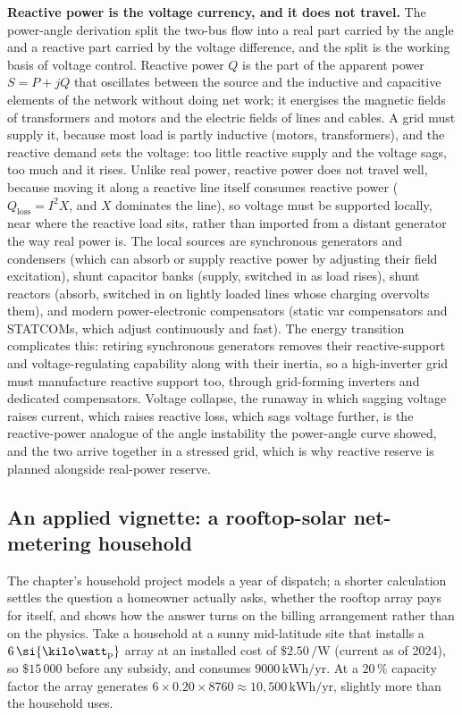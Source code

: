 \begin{mastery}
\textbf{Reactive power is the voltage currency, and it does not travel.} The
power-angle derivation split the two-bus flow into a real part carried by the
angle and a reactive part carried by the voltage difference, and the split is
the working basis of voltage control. Reactive power $Q$ is the part of the
apparent power $S = P + jQ$ that oscillates between the source and the
inductive and capacitive elements of the network without doing net work; it
energises the magnetic fields of transformers and motors and the electric
fields of lines and cables. A grid must supply it, because most load is
partly inductive (motors, transformers), and the reactive demand sets the
voltage: too little reactive supply and the voltage sags, too much and it
rises. Unlike real power, reactive power does not travel well, because moving
it along a reactive line itself consumes reactive power ($Q_{\text{loss}} =
I^2 X$, and $X$ dominates the line), so voltage must be supported locally,
near where the reactive load sits, rather than imported from a distant
generator the way real power is. The local sources are synchronous generators
and condensers (which can absorb or supply reactive power by adjusting their
field excitation), shunt capacitor banks (supply, switched in as load rises),
shunt reactors (absorb, switched in on lightly loaded lines whose charging
overvolts them), and modern power-electronic compensators (static var
compensators and STATCOMs, which adjust continuously and fast). The energy
transition complicates this: retiring synchronous generators removes their
reactive-support and voltage-regulating capability along with their inertia,
so a high-inverter grid must manufacture reactive support too, through
grid-forming inverters and dedicated compensators. Voltage collapse, the
runaway in which sagging voltage raises current, which raises reactive loss,
which sags voltage further, is the reactive-power analogue of the angle
instability the power-angle curve showed, and the two arrive together in a
stressed grid, which is why reactive reserve is planned alongside real-power
reserve.
\end{mastery}

\subsection{An applied vignette: a rooftop-solar net-metering household}

The chapter's household project models a year of dispatch; a shorter
calculation settles the question a homeowner actually asks, whether the
rooftop array pays for itself, and shows how the answer turns on the billing
arrangement rather than on the physics. Take a household at a sunny
mid-latitude site that installs a $6\,\si{\kilo\watt\textsubscript{p}}$ array
at an installed cost of $\$2.50\,\si{\per\watt}$ (current as of 2024), so
$\$15\,000$ before any subsidy, and consumes $9000\,\si{\kilo\watt\hour}/
\text{yr}$. At a $20\,\%$ capacity factor the array generates $6 \times 0.20
\times 8760 \approx 10{,}500\,\si{\kilo\watt\hour}/\text{yr}$, slightly more
than the household uses.

